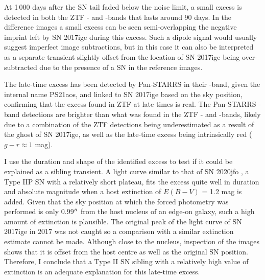 \documentclass[a4paper,oneside,12pt, class=Latex/Classes/PhDthesisPSnPDF, crop=false]{standalone}
\begin{document}
At 1\,000 days after the SN tail faded below the noise limit, a small excess is detected in both the ZTF \ztfg- and \ztfr-bands that lasts around 90 days. In the difference images a small excess can be seen semi-overlapping the negative imprint left by SN 2017ige during this excess. Such a dipole signal would usually suggest imperfect image subtractions, but in this case it can also be interpreted as a separate transient slightly offset from the location of SN 2017ige being over-subtracted due to the presence of a SN in the reference images.

The late-time excess has been detected by Pan-STARRS in their \ztfi-band, given the internal name PS21aos, and linked to SN 2017ige based on the sky position, confirming that the excess found in ZTF at late times is real. The Pan-STARRS \ztfi-band detections are brighter than what was found in the ZTF \ztfg- and \ztfr-bands, likely due to a combination of the ZTF detections being underestimated as a result of the ghost of SN 2017ige, as well as the late-time excess being intrinsically red ($g - r \approx 1$ mag).

I use the duration and shape of the identified excess to test if it could be explained as a sibling transient. A light curve similar to that of SN 2020jfo \citep{Sollerman_2020jfo, IIp_ext}, a Type IIP SN with a relatively short plateau, fits the excess quite well in duration and absolute magnitude when a host extinction of $ E(B - V)$ = 1.2 mag is added. Given that the sky position at which the forced photometry was performed is only 0.99$^{\prime\prime}$ from the host nucleus of an edge-on galaxy, such a high amount of extinction is plausible. The original peak of the light curve of SN 2017ige in 2017 was not caught so a comparison with a similar extinction estimate cannot be made. Although close to the nucleus, inspection of the images shows that it is offset from the host centre as well as the original SN position. Therefore, I conclude that a Type II SN sibling with a relatively high value of extinction is an adequate explanation for this late-time excess.\\
\end{document}
